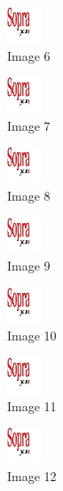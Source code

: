\begin{figure}[!h]
  \center
  \includegraphics[width=1cm]{img/test.jpg}
  \caption{Image 6}
\end{figure}

\begin{figure}[!h]
  \center
  \includegraphics[width=1cm]{img/test.jpg}
  \caption{Image 7}
\end{figure}

\begin{figure}[!h]
  \center
  \includegraphics[width=1cm]{img/test.jpg}
  \caption{Image 8}
\end{figure}

\begin{figure}[!h]
  \center
  \includegraphics[width=1cm]{img/test.jpg}
  \caption{Image 9}
\end{figure}

\begin{figure}[!h]
  \center
  \includegraphics[width=1cm]{img/test.jpg}
  \caption{Image 10}
\end{figure}

\begin{figure}[!h]
  \center
  \includegraphics[width=1cm]{img/test.jpg}
  \caption{Image 11}
\end{figure}

\begin{figure}[!h]
  \center
  \includegraphics[width=1cm]{img/test.jpg}
  \caption{Image 12}
\end{figure}


